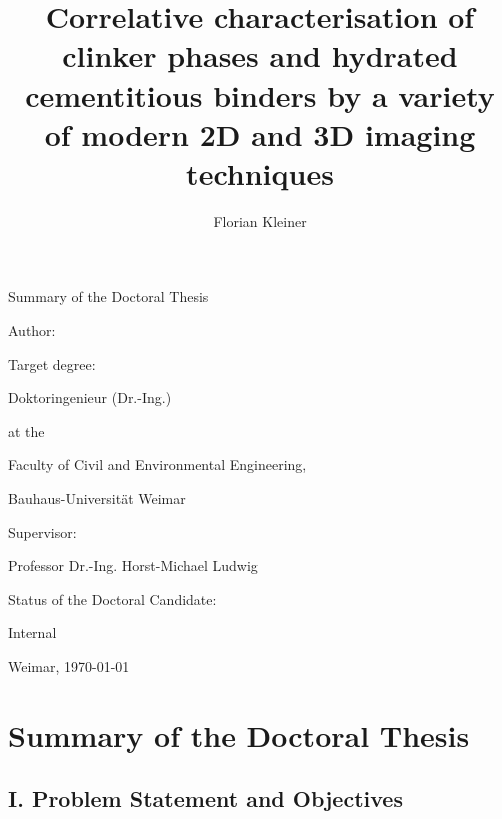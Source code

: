 \documentclass[11pt, a4paper]{article}
\title{Correlative characterisation of clinker phases and hydrated cementitious binders by a variety of modern 2D and 3D imaging techniques}
\author{Florian Kleiner}
\begin{document}
\begin{titlepage}
    \centering
    \vspace*{1cm}
    
    {\Large Summary of the Doctoral Thesis\par}
    \vspace{1.5cm}
    
    {\LARGE \textbf{\thetitle}\par}
    \vspace{2cm}
    
    {\large Author:\par}
    {\Large \theauthor\par}
    \vspace{1cm}
    
    {\large Target degree:\par}
    {\Large Doktoringenieur (Dr.-Ing.)\par}
    \vspace{1cm}
    
    { at the\par}
    {\large Faculty of Civil and Environmental Engineering,\par}
    {\large Bauhaus-Universität Weimar\par}
    \vspace{1cm}

    {\large Supervisor:\par}
    {\Large Professor Dr.-Ing. Horst-Michael Ludwig\par}
    \vspace{1cm}
    
    {\large Status of the Doctoral Candidate:\par}
    {\Large Internal\par}
    \vspace{3cm}
    
    \vfill
    
    {\large Weimar, \today\par}
\end{titlepage}

\newpage

\section*{Summary of the Doctoral Thesis}

\subsection*{I. Problem Statement and Objectives}
\end{document}
